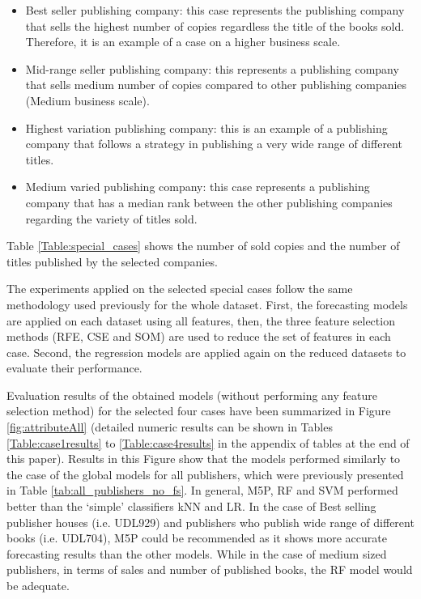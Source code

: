 \documentclass[a4paper,10pt,twocolumn,preprint,3p]{elsarticle}
\begin{document}
\begin{itemize}
    \item Best seller publishing company: this case represents the publishing company that sells the highest number of copies regardless the title of the books sold. Therefore, it is an example of a case on a higher business scale.
    \item Mid-range seller publishing company: this represents a publishing company that sells medium number of copies compared to other publishing companies (Medium business scale). 
    \item Highest variation publishing company: this is an example of a publishing company that follows a strategy in publishing a very wide range of different titles.
    \item Medium varied publishing company: this case represents a publishing company that has a median rank between the other publishing companies regarding the variety of titles sold.
\end{itemize}


Table \ref{Table:special_cases} shows the number of sold copies and the number 
of titles published by the selected companies.



The experiments applied on the selected special cases follow the same methodology 
used previously for the whole dataset. First, the forecasting models are applied 
on each dataset using all features, then, the three feature selection methods 
(RFE, CSE and SOM) are used to reduce the set of features in each case. 
Second, the regression models are applied again on the reduced datasets to 
evaluate their performance.

Evaluation results of the obtained models (without performing any feature selection 
method) for the selected four cases  have been summarized in Figure \ref{fig:attributeAll} 
(detailed numeric results can be shown in Tables \ref{Table:case1results} to \ref{Table:case4results} 
in the appendix of tables at the end of this paper).
Results in this Figure show that the models performed similarly to the case of 
the global models for all publishers, which were previously presented in 
Table \ref{tab:all_publishers_no_fs}. 
In general, M5P, RF and SVM performed better than the `simple' classifiers kNN and LR. 
In the case of Best selling publisher houses (i.e. UDL929) and publishers who 
publish wide range of different books (i.e. UDL704), M5P could be recommended 
as it shows more accurate forecasting results than the other models. 
While in the case of medium sized publishers, in terms of sales and number 
of published books, the RF model would be adequate.
\end{document}
